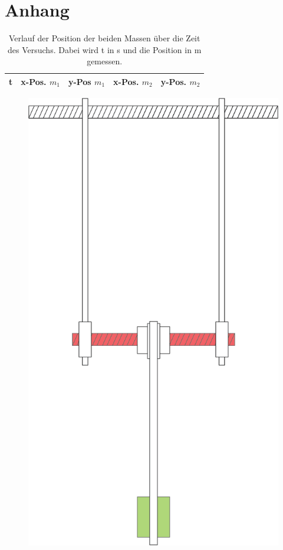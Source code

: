 \section{Anhang}
\nopagebreak
\begin{table}[h]
\scriptsize
\centering
\begin{tabular}{rllll}
t & x-Pos. $m_1$ & y-Pos $m_1$ & x-Pos. $m_2$ & y-Pos. $m_2$ \\
\toprule
\end{tabular}
\normalsize
\caption{Verlauf der Position der beiden Massen über die Zeit des Versuchs. Dabei wird t in s und die Position in m gemessen.}
\label{xy-table}
\end{table}



\begin{figure}
\centering
\includegraphics[width=.6\textwidth]{images/pendel-skizze.png}
\label{pic:skizze_versuchsaufbau}
\end{figure}